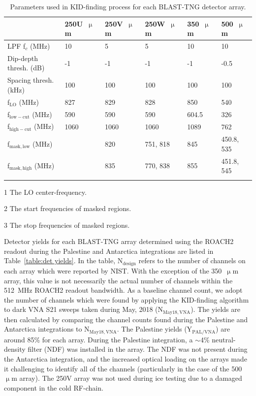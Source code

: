 \begin{table}[!hbtp]
  \centering
  \begin{threeparttable}
    \caption{Parameters used in KID-finding process for each BLAST-TNG detector array.}
\begin{tabular}{@{}llllll@{}}
\dtoprule
 & 250U~$\upmu$m & 250V~$\upmu$m & 250W~$\upmu$m & 350~$\upmu$m & 500~$\upmu$m \\ \midrule
LPF f$_{c}$ (MHz) & 10 & 5 & 5 & 10 & 10 \\
Dip-depth thresh. (dB) & -1 & -1 & -1 & -1 & -0.5 \\
Spacing thresh. (kHz) & 100 & 100 & 100 & 100 & 100 \\
f$_\mathrm{LO}$ (MHz)\tnote{1} & 827 & 829 & 828 & 850 & 540 \\
f$_{\mathrm{low-cut}}$ (MHz) & 590 & 590 & 590 & 604.5 & 326 \\
f$_{\mathrm{high-cut}}$ (MHz) & 1060 & 1060 & 1060 & 1089 & 762 \\
f$_{\mathrm{mask,low}}$ (MHz)\tnote{2} &  & 820 & 751, 818 & 845 & 450.8, 535 \\
f$_{\mathrm{mask,high}}$ (MHz)\tnote{3} &  & 835 & 770, 838 & 855 & 451.8, 545 \\ \dbottomrule
\\
\end{tabular}
\begin{tablenotes}
\item [1] The LO center-frequency.
\item [2] The start frequencies of masked regions.
\item [3] The stop frequencies of masked regions.
\vspace{2mm}
\end{tablenotes}
\label{table:KID finding params}
\end{threeparttable}
\end{table}

Detector yields for each BLAST-TNG array determined using the ROACH2 readout during the Palestine and Antarctica integrations are listed in Table~\ref{table:det yields}. In the table, N$_{\mathrm{design}}$ refers to the number of channels on each array which were reported by NIST. With the exception of the 350~$\upmu$m array, this value is not necessarily the actual number of channels within the 512~MHz ROACH2 readout bandwidth. As a baseline channel count, we adopt the number of channels which were found by applying the KID-finding algorithm to dark VNA \gls{S21} sweeps taken during May, 2018 (N$_{\mathrm{May18,VNA}}$). The yields are then calculated by comparing the channel counts found during the Palestine and Antarctica integrations to N$_{\mathrm{May18,VNA}}$. The Palestine yields (Y$_{\mathrm{PAL/VNA}}$) are around 85\% for each array. During the Palestine integration, a $\sim$4\% neutral-density filter (NDF) was installed in the array. The NDF was not present during the Antarctica integration, and the increased optical loading on the arrays made it challenging to identify all of the channels (particularly in the case of the 500~$\upmu$m array). The 250V array was not used during ice testing due to a damaged component in the cold RF-chain.

